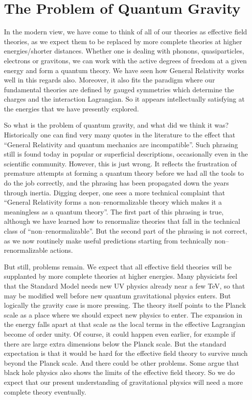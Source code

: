 \documentclass[11pt,a4paper]{article}
\begin{document}
\newpage

\section{The Problem of Quantum Gravity}
\label{sec:QG} 

In the modern view, we have come to think of all of our theories as effective field theories, as we expect them to be replaced by more complete theories at higher energies/shorter distances. Whether one is dealing with phonons, quasiparticles, electrons or gravitons, we can work with the active degrees of freedom at a given energy and form a quantum theory. We have seen how General Relativity works well in this regards also. Moreover, it also fits the paradigm where our fundamental theories are defined by gauged symmetries which determine the charges and the interaction Lagrangian. So it appears intellectually satisfying at the energies that we have presently explored.

So what is the problem of quantum gravity, and what did we think it was? Historically one can find very many quotes in the literature to the effect that ``General Relativity and quantum mechanics are incompatible''.  Such phrasing still is found today in popular or superficial descriptions, occasionally even in the scientific community. However, this is just wrong. It reflects the frustration of premature attempts at forming a quantum theory before we had all the tools to do the job correctly, and the phrasing has been propagated down the years through inertia. Digging deeper, one sees a more technical complaint that ``General Relativity forms a non--renormalizable theory which makes it a meaningless as a quantum theory''. The first part of this phrasing is true, although we have learned how to renormalize theories that fall in the technical class of ``non--renormalizable''. But the second part of the phrasing is not correct, as we now routinely make useful predictions starting from technically non--renormalizable actions.

But still, problems remain. We expect that all effective field theories will be supplanted by more complete theories at higher energies. Many physicists feel that the Standard Model needs new UV physics already near a few TeV, so that may be modified well before new quantum gravitational physics enters. But logically the gravity case is more pressing. The theory itself points to the Planck scale as a place where we should expect new physics to enter. The expansion in the energy falls apart at that scale as the local terms in the effective Lagrangian become of order unity. Of course, it could happen even earlier, for example if there are large extra dimensions below the Planck scale. But the standard expectation is that it would be hard for the effective field theory to survive much beyond the Planck scale. And there could be other problems. Some argue that black hole physics also shows the limits of the effective field theory. So we do expect that our present understanding of gravitational physics will need a more complete theory eventually.
\end{document}
